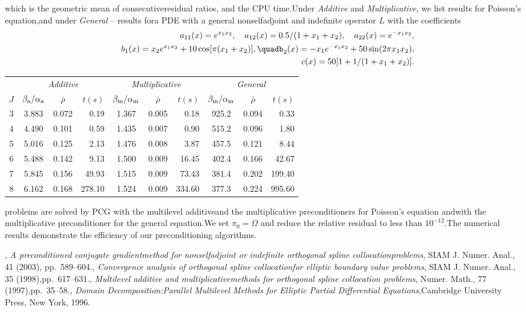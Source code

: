 \documentclass{report}
\begin{document}
which is the geometric mean of consecutiveresidual ratios,
and the CPU time.Under \textit{Additive} and \textit{Multiplicative},
we list results for Poisson's equation,and under \textit{General} -- results fora PDE with a general nonselfadjoint and indefinite operator $L$ with the coefficients\begin{eqnarray*}&&a_{11}(x)=e^{x_1x_2},\quad a_{12}(x)=0.5/(1+x_{1}+x_{2}),\quad a_{22}(x)=e^{-x_1x_2},\\&&b_{1}(x)=x_2e^{x_1x_2}+10\cos[\pi(x_1+x_2)],\quadb_{2}(x)=-x_1 e^{-x_1x_2}+50\sin (2\pi x_1x_2),\\&&c(x)=50[1+1/(1+x_1+x_2)].\end{eqnarray*}\begin{center}\begin{tabular}{c|ccr|ccr|ccr}
& \multicolumn{3}{c|}{\textit{Additive}}
& \multicolumn{3}{c|}{\textit{Multiplicative}}&\multicolumn{3}{c}{\textit{General}}\\\cline{2-10}$J$
& $\beta_{\textrm{\scriptsize a}}/\alpha_{\textrm{\scriptsize a}}$
& $\bar{\rho}$
& $t(s)$
& $\beta_{\textrm{\scriptsize m}}/\alpha_{\textrm{\scriptsize m}}$
& $\bar{\rho}$
& $t(s)$
& $\beta_{\textrm{\scriptsize m}}/\alpha_{\textrm{\scriptsize m}}$
& $\bar{\rho}$
& $t(s)$\\\hline3
& 3.883
& 0.072
& 0.19
& 1.367
& 0.005
& 0.18
& 925.2
& 0.094
& 0.33\\4
& 4.490
& 0.101
& 0.59
& 1.435
& 0.007
& 0.90
& 515.2
& 0.096
& 1.80\\5
& 5.016
& 0.125
& 2.13
& 1.476
& 0.008
& 3.87
& 457.5
& 0.121
& 8.44\\6
& 5.488
& 0.142
& 9.13
& 1.500
& 0.009
& 16.45
& 402.4
& 0.166
& 42.67\\7
& 5.845
& 0.156
& 49.93
& 1.515
& 0.009
& 73.43
& 381.4
& 0.202
& 199.40\\8
& 6.162
& 0.168
& 278.10
& 1.524
& 0.009
& 334.60
& 377.3
& 0.224
& 995.60\end{tabular}\end{center}\medskipThe problems are solved by PCG with the multilevel additiveand the multiplicative preconditioners for Poisson's equation andwith the multiplicative preconditioner for the general equation.We set $\pi_0=\Omega$ and reduce the relative residual to less than $10^{-12}$.The numerical results demonstrate the efficiency of our preconditioning algorithms.\begin{thebibliography}{1},
{\em A preconditioned conjugate gradientmethod for nonselfadjoint or indefinite orthogonal spline collocationproblems},
SIAM J.
Numer.
Anal.,
41 (2003),
pp.~589--604.,
{\em Convergence analysis of orthogonal spline collocationfor elliptic boundary value problems},
SIAM J.
Numer.
Anal.,
35 (1998),pp.~617--631.,
{\em Multilevel additive and multiplicativemethods for orthogonal spline collocation problems},
Numer.
Math.,
77 (1997),pp.~35--58.,
{\em Domain Decomposition:Parallel Multilevel Methods for Elliptic Partial Differential Equations},Cambridge University Press,
New York,
1996.\end{thebibliography}
\end{document}
